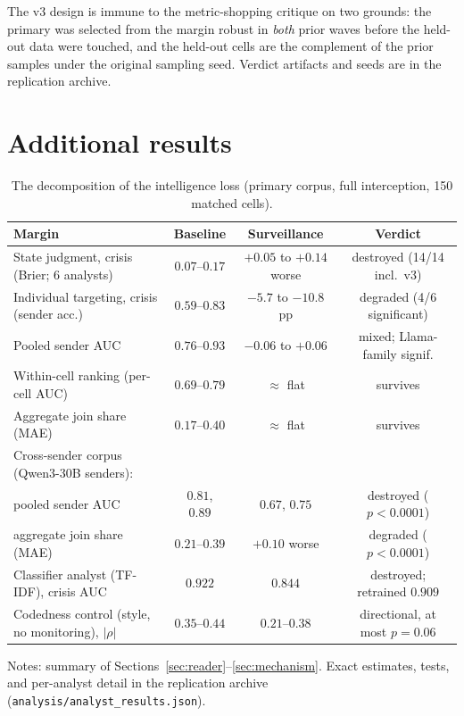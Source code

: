 \documentclass[11pt]{article}
\theoremstyle{remark}
\begin{document}
\begin{appendices}
The v3 design is immune to the metric-shopping critique on two grounds: the primary was selected from the margin robust in \emph{both} prior waves before the held-out data were touched, and the held-out cells are the complement of the prior samples under the original sampling seed. Verdict artifacts and seeds are in the replication archive.

\section{Additional results}\label{app:extra}

\begin{table}[ht]\centering\small
\caption{The decomposition of the intelligence loss (primary corpus, full interception, 150 matched cells).}\label{tab:decomp}
\begin{tabular}{lccc}
\toprule
Margin & Baseline & Surveillance & Verdict \\
\midrule
State judgment, crisis (Brier; 6 analysts) & $0.07$--$0.17$ & $+0.05$ to $+0.14$ worse & destroyed (14/14 incl.\ v3) \\
Individual targeting, crisis (sender acc.) & $0.59$--$0.83$ & $-5.7$ to $-10.8$ pp & degraded (4/6 significant) \\
Pooled sender AUC & $0.76$--$0.93$ & $-0.06$ to $+0.06$ & mixed; Llama-family signif. \\
Within-cell ranking (per-cell AUC) & $0.69$--$0.79$ & $\approx$ flat & survives \\
Aggregate join share (MAE) & $0.17$--$0.40$ & $\approx$ flat & survives \\
\midrule
Cross-sender corpus (Qwen3-30B senders): & & & \\
\quad pooled sender AUC & $0.81$, $0.89$ & $0.67$, $0.75$ & destroyed ($p<0.0001$) \\
\quad aggregate join share (MAE) & $0.21$--$0.39$ & $+0.10$ worse & degraded ($p<0.0001$) \\
\midrule
Classifier analyst (TF-IDF), crisis AUC & $0.922$ & $0.844$ & destroyed; retrained $0.909$ \\
Codedness control (style, no monitoring), $|\rho|$ & $0.35$--$0.44$ & $0.21$--$0.38$ & directional, at most $p=0.06$ \\
\bottomrule
\end{tabular}
\par\smallskip\footnotesize{Notes: summary of Sections~\ref{sec:reader}--\ref{sec:mechanism}. Exact estimates, tests, and per-analyst detail in the replication archive (\texttt{analysis/analyst\_results.json}).}
\end{table}


\end{appendices}
\end{document}
